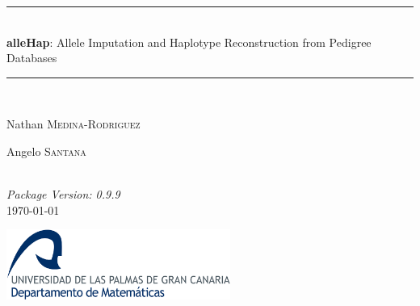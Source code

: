 \begin{titlepage}

\newcommand{\HRule}{\rule{\linewidth}{0.5mm}}

\begin{center}


\HRule \\[1cm]

\LARGE \textbf{alleHap}: Allele Imputation and Haplotype Reconstruction from Pedigree Databases
\\[0.65cm]

\HRule \\[1cm]


\begin{minipage}{0.5\textwidth}
\begin{flushleft} \large
Nathan \textsc{Medina-Rodriguez}
\end{flushleft}
\end{minipage}%
\begin{minipage}{0.4\textwidth}
\begin{flushright} \large
Angelo \textsc{Santana}
\end{flushright}
\end{minipage}\\[1.5cm]


\large \emph{Package Version: 0.9.9}\\[1.2cm]
\small \today

\vfill

\includegraphics[width=0.55\textwidth]{./logo}~\\

\end{center}

\end{titlepage}


